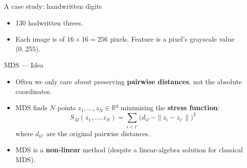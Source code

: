 \documentclass[aspectratio=169,t]{beamer}
\begin{document}
\begin{frame}{A case study: handwritten digits}
  \begin{itemize}
      \item 130 hadwritten threes.
      \item Each image is of $16\times 16 = 256$ pixels. Feature is a pixel's grayscale value (0..255). 
  \end{itemize}
\end{frame}



\begin{frame}{MDS --- Idea}
  \begin{itemize}
    \setlength{\itemsep}{0.35cm}
    \item Often we only care about preserving \textbf{pairwise distances}, not the absolute coordinates.
    \item MDS finds $N$ points $z_1, \ldots, z_N \in \mathbb{R}^q$ minimising the \textbf{stress function}:
    \[
      S_M(z_1,\ldots,z_N)
      = \sum_{i < i'} \bigl(d_{ii'} - \|z_i - z_{i'}\|\bigr)^2
      \tag{3}
    \]
    where $d_{ii'}$ are the original pairwise distances.
    \item MDS is a \textbf{non-linear} method (despite a linear-algebra solution for classical MDS).
  \end{itemize}
\end{frame}
\end{document}
